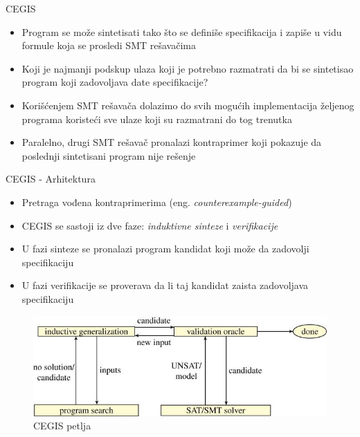 
\begin{frame}{CEGIS}
    \begin{itemize}
        \item Program se može sintetisati tako što se definiše specifikacija i zapiše u vidu formule koja se prosledi SMT rešavačima
        \item Koji je najmanji podskup ulaza koji je potrebno razmatrati da bi se sintetisao program koji zadovoljava date specifikacije?
        \item Korišćenjem SMT rešavača dolazimo do svih mogućih implementacija željenog programa koristeći sve ulaze koji su razmatrani do tog trenutka
        \item Paralelno, drugi SMT rešavač pronalazi kontraprimer koji pokazuje da poslednji sintetisani program nije rešenje
    \end{itemize}
\end{frame}

\begin{frame}[fragile]{CEGIS - Arhitektura}
    \begin{itemize}
        \item Pretraga vođena kontraprimerima (eng. \emph{counterexample-guided})
        \item CEGIS se sastoji iz dve faze: \emph{induktivne sinteze} i \emph{verifikacije}
        \item U fazi sinteze se pronalazi program kandidat koji može da zadovolji specifikaciju
        \item U fazi verifikacije se proverava da li taj kandidat zaista zadovoljava specifikaciju
    \end{itemize}
    \begin{figure}
        \begin{center}
            \includegraphics[scale=0.4]{../resources/cegis.jpeg}
        \end{center}
        \caption{CEGIS petlja}
    \end{figure}
\end{frame}

